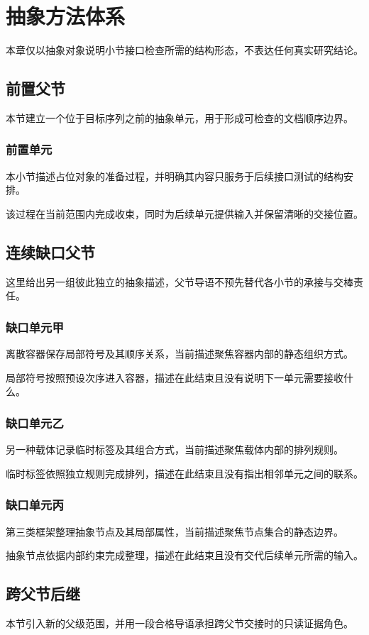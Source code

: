 \chapter{抽象方法体系}
本章仅以抽象对象说明小节接口检查所需的结构形态，不表达任何真实研究结论。

\section{前置父节}
本节建立一个位于目标序列之前的抽象单元，用于形成可检查的文档顺序边界。

\subsection{前置单元}
本小节描述占位对象的准备过程，并明确其内容只服务于后续接口测试的结构安排。

该过程在当前范围内完成收束，同时为后续单元提供输入并保留清晰的交接位置。

\section{连续缺口父节}
这里给出另一组彼此独立的抽象描述，父节导语不预先替代各小节的承接与交棒责任。

\subsection{缺口单元甲}
离散容器保存局部符号及其顺序关系，当前描述聚焦容器内部的静态组织方式。

局部符号按照预设次序进入容器，描述在此结束且没有说明下一单元需要接收什么。

\subsection{缺口单元乙}
另一种载体记录临时标签及其组合方式，当前描述聚焦载体内部的排列规则。

临时标签依照独立规则完成排列，描述在此结束且没有指出相邻单元之间的联系。

\subsection{缺口单元丙}
第三类框架整理抽象节点及其局部属性，当前描述聚焦节点集合的静态边界。

抽象节点依据内部约束完成整理，描述在此结束且没有交代后续单元所需的输入。

\section{跨父节后继}
本节引入新的父级范围，并用一段合格导语承担跨父节交接时的只读证据角色。

